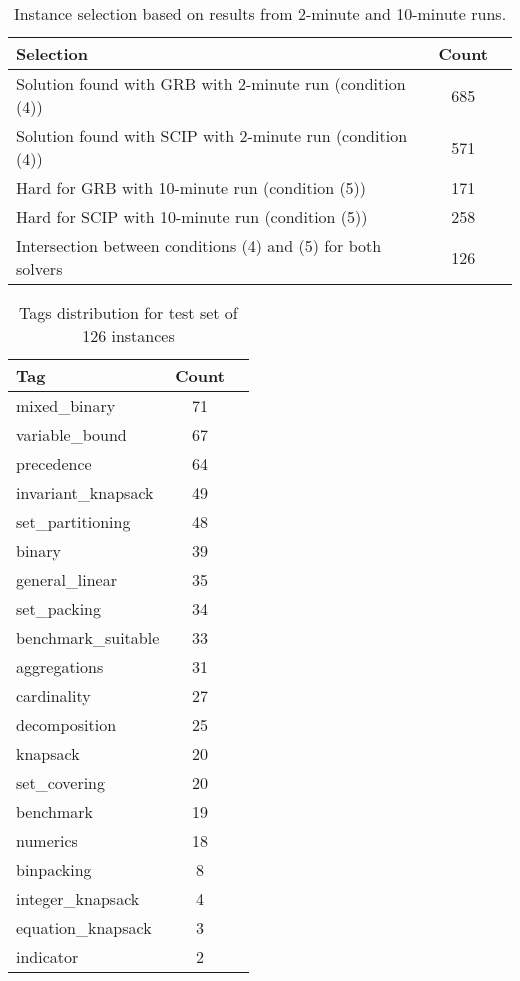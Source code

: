 \documentclass[3p, authoryear, times]{elsarticle}
\begin{document}
\begin{table}[h]
\centering
\caption{Instance selection based on results from 2-minute and 10-minute runs.}
\label{tab:instance_selection_from_results}
\begin{tabular}{lcc}
\toprule
{Selection} & {Count} \\
\midrule
Solution found with GRB with 2-minute run (condition (4)) & 685 \\
Solution found with SCIP with 2-minute run (condition (4)) & 571 \\
Hard for GRB with 10-minute run (condition (5)) & 171 \\
Hard for SCIP with 10-minute run (condition (5)) & 258 \\
Intersection between conditions (4) and (5) for both solvers & 126 \\
\bottomrule
\end{tabular}
\end{table}




\begin{table}[h]
\centering
\caption{Tags distribution for test set of 126 instances}
\label{tab:tags_for_selected}
\begin{tabular}{lcc}
\toprule
{Tag} & {Count} \\
\midrule
mixed\_binary & 71 \\
variable\_bound & 67 \\
precedence & 64 \\
invariant\_knapsack & 49 \\
set\_partitioning & 48 \\
binary & 39 \\
general\_linear & 35 \\
set\_packing & 34 \\
benchmark\_suitable & 33 \\
aggregations & 31 \\
cardinality & 27 \\
decomposition & 25 \\
knapsack & 20 \\
set\_covering & 20 \\
benchmark & 19 \\
numerics & 18 \\
binpacking & 8 \\
integer\_knapsack & 4 \\
equation\_knapsack & 3 \\
indicator & 2 \\
\bottomrule
\end{tabular}
\end{table}
\end{document}

